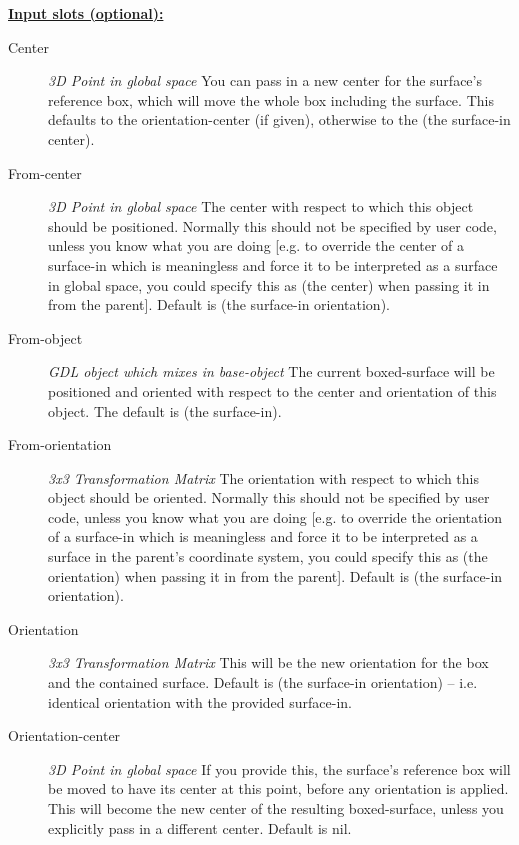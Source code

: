 \documentclass [11pt]{book}
\begin{document}
\begin{itemize}
\textbf{
\underline{Input slots (optional):}}

\begin{description}

\item [Center]
\emph{3D Point in global space} You can pass in a new center for the surface's reference box,
which will move the whole box including the surface. This defaults to the
orientation-center (if given), otherwise to the (the surface-in center).


\item [From-center]
\emph{3D Point in global space} The center with respect to which this object should be positioned. Normally
this should not be specified by user code, unless you know what you are doing [e.g. to override the center
of a surface-in which is meaningless and force it to be interpreted as a surface in global space, you could
specify this as (the center) when passing it in from the parent]. Default is (the surface-in orientation).


\item [From-object]
\emph{GDL object which mixes in base-object} The current boxed-surface will be positioned and oriented with respect
to the center and orientation of this object. The default is (the surface-in).


\item [From-orientation]
\emph{3x3 Transformation Matrix} The orientation with respect to which this object should be oriented. Normally
this should not be specified by user code, unless you know what you are doing [e.g. to override the orientation
of a surface-in which is meaningless and force it to be interpreted as a surface in the parent's coordinate system,
you could specify this as (the orientation) when passing it in from the parent]. Default is (the surface-in orientation).


\item [Orientation]
\emph{3x3 Transformation Matrix} This will be the new orientation for the box and the contained surface. Default is
(the surface-in orientation) -- i.e. identical orientation with the provided surface-in.


\item [Orientation-center]
\emph{3D Point in global space} If you provide this, the surface's reference box will be moved to have its center
at this point, before any orientation is applied. This will become the new center of the resulting boxed-surface,
unless you explicitly pass in a different center. Default is nil.



\end{description}
\end{itemize}
\end{document}
